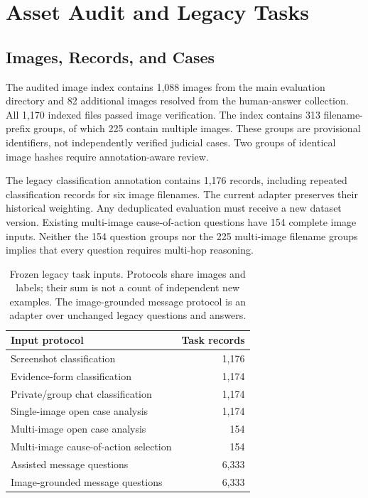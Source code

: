 \documentclass[11pt]{article}
\begin{document}
\section{Asset Audit and Legacy Tasks}
\subsection{Images, Records, and Cases}
The audited image index contains 1,088 images from the main evaluation directory and 82 additional images resolved from the human-answer collection. All 1,170 indexed files passed image verification. The index contains 313 filename-prefix groups, of which 225 contain multiple images. These groups are provisional identifiers, not independently verified judicial cases. Two groups of identical image hashes require annotation-aware review.

The legacy classification annotation contains 1,176 records, including repeated classification records for six image filenames. The current adapter preserves their historical weighting. Any deduplicated evaluation must receive a new dataset version. Existing multi-image cause-of-action questions have 154 complete image inputs. Neither the 154 question groups nor the 225 multi-image filename groups implies that every question requires multi-hop reasoning.

\begin{table}[t]
\centering
\small
\begin{tabular}{lr}
\toprule
Input protocol & Task records \\
\midrule
Screenshot classification & 1,176 \\
Evidence-form classification & 1,174 \\
Private/group chat classification & 1,174 \\
Single-image open case analysis & 1,174 \\
Multi-image open case analysis & 154 \\
Multi-image cause-of-action selection & 154 \\
Assisted message questions & 6,333 \\
Image-grounded message questions & 6,333 \\
\bottomrule
\end{tabular}
\caption{Frozen legacy task inputs. Protocols share images and labels; their sum is not a count of independent new examples. The image-grounded message protocol is an adapter over unchanged legacy questions and answers.}
\label{tab:tasks}
\end{table}
\end{document}
